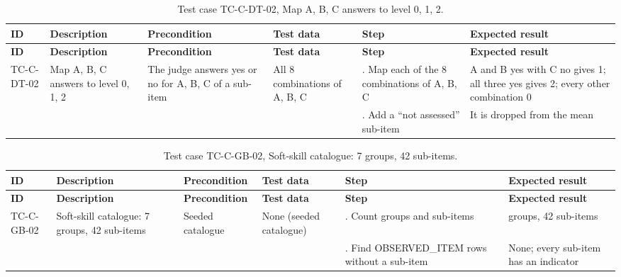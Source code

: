 {\footnotesize{}\renewcommand{\arraystretch}{1.1}
\begin{longtable}{|>{\raggedright\arraybackslash}p{}|>{\raggedright\arraybackslash}p{}|>{\raggedright\arraybackslash}p{}|>{\raggedright\arraybackslash}p{}|>{\raggedright\arraybackslash}p{}|>{\raggedright\arraybackslash}p{}|}
\caption{Test case TC-C-DT-02, Map A, B, C answers to level 0, 1, 2.} \\
\hline
\textbf{ID} & \textbf{Description} & \textbf{Precondition} & \textbf{Test data} & \textbf{Step} & \textbf{Expected result} \\ \hline
\endfirsthead
\hline
\textbf{ID} & \textbf{Description} & \textbf{Precondition} & \textbf{Test data} & \textbf{Step} & \textbf{Expected result} \\ \hline
\endhead
TC-C-DT-02 & Map A, B, C answers to level 0, 1, 2 & The judge answers yes or no for A, B, C of a sub-item & All 8 combinations of A, B, C & 1. Map each of the 8 combinations of A, B, C & A and B yes with C no gives 1; all three yes gives 2; every other combination 0 \\ \cline{5-6}
 &  &  &  & 2. Add a ``not assessed'' sub-item & It is dropped from the mean \\ \hline
\end{longtable}
}

{\footnotesize{}\renewcommand{\arraystretch}{1.1}
\begin{longtable}{|>{\raggedright\arraybackslash}p{}|>{\raggedright\arraybackslash}p{}|>{\raggedright\arraybackslash}p{}|>{\raggedright\arraybackslash}p{}|>{\raggedright\arraybackslash}p{}|>{\raggedright\arraybackslash}p{}|}
\caption{Test case TC-C-GB-02, Soft-skill catalogue: 7 groups, 42 sub-items.} \\
\hline
\textbf{ID} & \textbf{Description} & \textbf{Precondition} & \textbf{Test data} & \textbf{Step} & \textbf{Expected result} \\ \hline
\endfirsthead
\hline
\textbf{ID} & \textbf{Description} & \textbf{Precondition} & \textbf{Test data} & \textbf{Step} & \textbf{Expected result} \\ \hline
\endhead
TC-C-GB-02 & Soft-skill catalogue: 7 groups, 42 sub-items & Seeded catalogue & None (seeded catalogue) & 1. Count groups and sub-items & 7 groups, 42 sub-items \\ \cline{5-6}
 &  &  &  & 2. Find OBSERVED\_\allowbreak{}ITEM rows without a sub-item & None; every sub-item has an indicator \\ \hline
\end{longtable}
}

